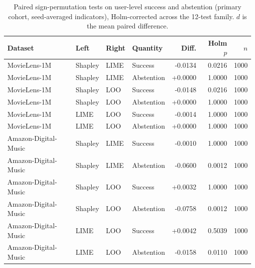 \begin{table}[t]\centering\scriptsize\setlength{\tabcolsep}{3pt}
\caption{Paired sign-permutation tests on user-level success and abstention
(primary cohort, seed-averaged indicators), Holm-corrected across the
12-test family. $d$ is the mean paired difference.}
\label{tab:success-abstention-tests}
\begin{tabular}{@{}llllrrr@{}}
\toprule
Dataset & Left & Right & Quantity & Diff. & Holm $p$ & $n$ \\
\midrule
MovieLens-1M & Shapley & LIME & Success & -0.0134 & 0.0216 & 1000 \\
MovieLens-1M & Shapley & LIME & Abstention & +0.0000 & 1.0000 & 1000 \\
MovieLens-1M & Shapley & LOO & Success & -0.0148 & 0.0216 & 1000 \\
MovieLens-1M & Shapley & LOO & Abstention & +0.0000 & 1.0000 & 1000 \\
MovieLens-1M & LIME & LOO & Success & -0.0014 & 1.0000 & 1000 \\
MovieLens-1M & LIME & LOO & Abstention & +0.0000 & 1.0000 & 1000 \\
Amazon-Digital-Music & Shapley & LIME & Success & -0.0010 & 1.0000 & 1000 \\
Amazon-Digital-Music & Shapley & LIME & Abstention & -0.0600 & 0.0012 & 1000 \\
Amazon-Digital-Music & Shapley & LOO & Success & +0.0032 & 1.0000 & 1000 \\
Amazon-Digital-Music & Shapley & LOO & Abstention & -0.0758 & 0.0012 & 1000 \\
Amazon-Digital-Music & LIME & LOO & Success & +0.0042 & 0.5039 & 1000 \\
Amazon-Digital-Music & LIME & LOO & Abstention & -0.0158 & 0.0110 & 1000 \\
\bottomrule
\end{tabular}
\end{table}

